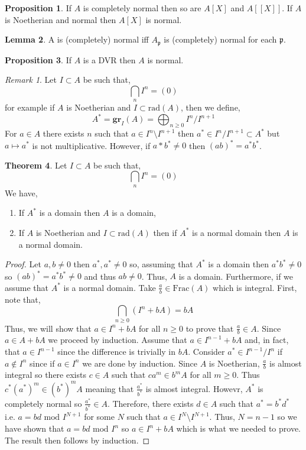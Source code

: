 \documentclass[12pt]{article}
\newcommand{\Frac}[1]{\mathrm{Frac}\left(#1\right)}
\newcommand{\rad}[1]{\mathrm{rad}\left( #1 \right)}
\newcommand{\gr}[2]{\mathbf{gr}_{#1}\left(#2\right)}
\newcommand{\p}{\mathfrak{p}}
\theoremstyle{remark}
\newtheorem*{remark}{Remark}
\theoremstyle{definition}
\newtheorem{theorem}{Theorem}[section]
\newtheorem{lemma}[theorem]{Lemma}
\newtheorem{proposition}[theorem]{Proposition}
\begin{document}
\begin{proposition}
If $A$ is completely normal then so are $A[X]$ and $A[[X]]$. If $A$ is Noetherian and normal then $A[X]$ is normal. 
\end{proposition}

\begin{lemma}
A is (completely) normal iff $A_{\p}$ is (completely) normal for each $\p$. 
\end{lemma}

\begin{proposition}
If $A$ is a DVR then $A$ is normal. 
\end{proposition}

\begin{remark}
Let $I \subset A$ be such that,
\[ \bigcap_{n} I^n = (0) \]
for example if $A$ is Noetherian and $I \subset \rad{A}$, then we define,
\[ A^* = \gr{I}{A} = \bigoplus_{n \ge 0} I^n / I^{n + 1} \]
For $a \in A$ there exists $n$ such that $a \in I^n \setminus I^{n+1}$ then $a^* \in I^n / I^{n+1} \subset A^*$ but $a \mapsto a^*$ is not multiplicative. However, if $a* b^* \neq 0$ then $(ab)^* = a^* b^*$.
\end{remark}

\begin{theorem}
Let $I \subset A$ be such that,
\[ \bigcap_{n} I^n = (0) \]
We have,
\begin{enumerate}
\item If $A^*$ is a domain then $A$ is a domain,
\item If $A$ is Noetherian and $I \subset \rad{A}$ then if $A^*$ is a normal domain then $A$ is a normal domain. 
\end{enumerate}
\end{theorem}

\begin{proof}
Let $a, b \neq 0$ then $a^*, a^* \neq 0$ so, assuming that $A^*$ is a domain then $a^* b^* \neq 0$ so $(a b)^* = a^* b^* \neq 0$ and thus $ab \neq 0$. Thus, $A$ is a domain. Furthermore, if we assume that $A^*$ is a normal domain. Take $\frac{a}{b} \in \Frac{A}$ which is integral. First, note that,
\[ \bigcap_{n \ge 0} (I^n + b A) = b A \]
Thus, we will show that $a \in I^n + b A$ for all $n \ge 0$ to prove that $\frac{a}{b} \in A$. Since $a \in A + b A$ we proceed by induction. Assume that $a \in I^{n-1} + b A$ and, in fact, that $a \in I^{n-1}$ since the difference is trivially in $b A$. Consider $a^* \in I^{n-1} / I^n$ if $a \notin I^n$ since if $a \in I^n$ we are done by induction. Since $A$ is Noetherian, $\frac{a}{b}$ is almost integral so there exists $c \in A$ such that $c a^m \in b^m A$ for all $m \ge 0$. Thus $c^* (a^*)^m \in (b^*)^m A$ meaning that $\frac{a^*}{b^*}$ is almost integral. Howevr, $A^*$ is completely normal so $\frac{a^*}{b^*} \in A$. Therefore, there exists $d \in A$ such that $a^* = b^* d^*$ i.e. $a = bd \text{ mod } I^{N+1}$ for some $N$ such that $a \in I^N \setminus I^{N+1}$. Thus, $N = n - 1$ so we have shown that $a = bd \text{ mod } I^{n}$ so $a \in I^n + b A$ which is what we needed to prove. The result then follows by induction.  
\end{proof}
\end{document}
